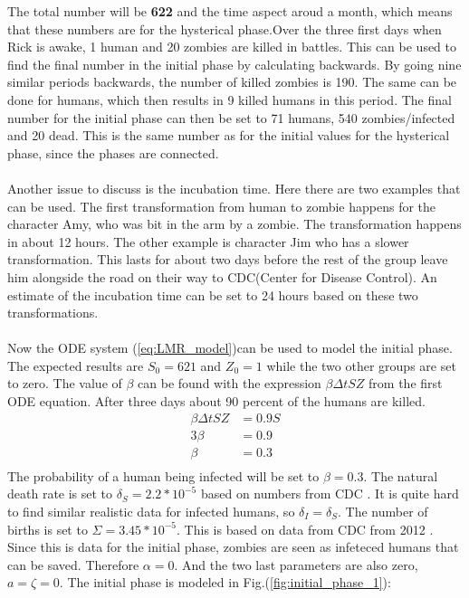 \documentclass[%
twoside,                 %
final,                   %
chapterprefix=true,      %
open=right               %
10pt]{book}
\begin{document}
\noindent
The total number will be \textbf{622} and the time aspect aroud a month, which means that these numbers are for the hysterical phase.Over the three first days when Rick is awake, 1 human and 20 zombies are killed in battles. This can be used to find the final number in the initial phase by calculating backwards. By going nine similar periods backwards, the number of killed zombies is 190. The same can be done for humans, which then results in 9 killed humans in this period. The final number for the initial phase can then be set to 71 humans, 540 zombies/infected and 20 dead. This is the same number as for the initial values for the hysterical phase, since the phases are connected.
\\
\\
Another issue to discuss is the incubation time. Here there are two examples that can be used. The first transformation from human to zombie happens for the character Amy, who was bit in the arm by a zombie. The transformation happens in about 12 hours. The other example is character Jim who has a slower transformation. This lasts for about two days before the rest of the group leave him alongside the road on their way to CDC(Center for Disease Control). An estimate of the incubation time can be set to 24 hours based on these two transformations.
\\
\\
Now the ODE system (\ref{eq:LMR_model})can be used to model the initial phase. The expected results are $S_0 = 621$ and $Z_0 = 1$ while the two other groups are set to zero. The value of $\beta$ can be found with the expression $\beta \Delta t S Z$ from the first ODE equation. After three days about 90 percent of the humans are killed.
\begin{equation}
	\begin{aligned}
	\beta\Delta t S Z &= 0.9 S\\
	3\beta   &= 0.9 \\
	\beta &= 0.3 \\
	\end{aligned}
\end{equation}
The probability of a human being infected will be set to $\beta = 0.3$. The natural death rate is set to $\delta_S = 2.2*10^{-5}$ based on numbers from CDC \cite{CBC_deaths_2011}. It is quite hard to find similar realistic data for infected humans, so $\delta_I = \delta_S$. The number of births is set to $\Sigma = 3.45*10^{-5}$. This is based on data from CDC from 2012 \cite{CBC_births_2012}. Since this is data for the initial phase, zombies are seen as infeteced humans that can be saved. Therefore $\alpha = 0$. And the two last parameters are also zero, $a = \zeta = 0$. The initial phase is modeled in Fig.(\ref{fig:initial_phase_1}):
\end{document}
